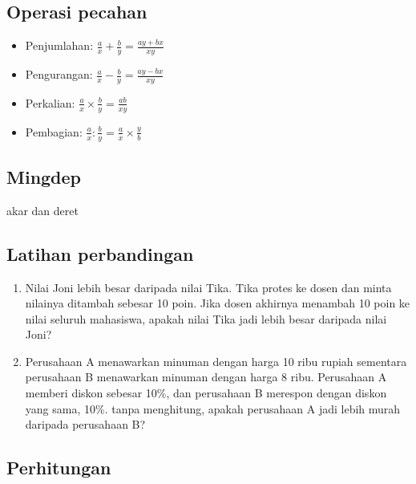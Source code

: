\documentclass[
  letterpaper,
  DIV=11,
  numbers=noendperiod]{scrartcl}
\begin{document}
\hypertarget{operasi-pecahan}{%
\subsection{Operasi pecahan}\label{operasi-pecahan}}

\begin{itemize}
\item
  Penjumlahan: \(\frac{a}{x} + \frac{b}{y}=\frac{ay+bx}{xy}\)
\item
  Pengurangan: \(\frac{a}{x} - \frac{b}{y}=\frac{ay-bx}{xy}\)
\item
  Perkalian: \(\frac{a}{x} \times \frac{b}{y} = \frac{ab}{xy}\)
\item
  Pembagian:
  \(\frac{a}{x} : \frac{b}{y}=\frac{a}{x} \times \frac{y}{b}\)
\end{itemize}

\hypertarget{mingdep}{%
\subsection{Mingdep}\label{mingdep}}

akar dan deret

\hypertarget{latihan-perbandingan}{%
\subsection{Latihan perbandingan}\label{latihan-perbandingan}}

\begin{enumerate}
\def\labelenumi{\arabic{enumi}.}
\item
  Nilai Joni lebih besar daripada nilai Tika. Tika protes ke dosen dan
  minta nilainya ditambah sebesar 10 poin. Jika dosen akhirnya menambah
  10 poin ke nilai seluruh mahasiswa, apakah nilai Tika jadi lebih besar
  daripada nilai Joni?
\item
  Perusahaan A menawarkan minuman dengan harga 10 ribu rupiah sementara
  perusahaan B menawarkan minuman dengan harga 8 ribu. Perusahaan A
  memberi diskon sebesar 10\%, dan perusahaan B merespon dengan diskon
  yang sama, 10\%. tanpa menghitung, apakah perusahaan A jadi lebih
  murah daripada perusahaan B?
\end{enumerate}

\hypertarget{perhitungan}{%
\subsection{Perhitungan}\label{perhitungan}}
\end{document}
